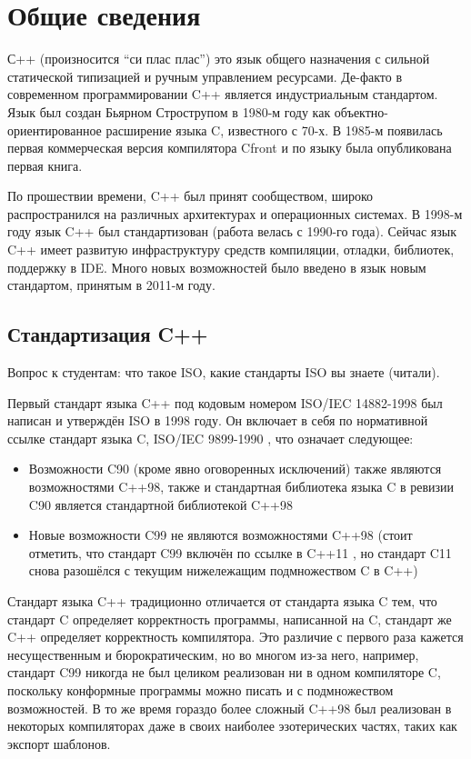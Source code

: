 \documentclass[a4paper,12pt,oneside]{article}
\begin{document}
\pagebreak
\section{Общие сведения}\label{Introduction}

С++ (произносится ``си плас плас'') это язык общего назначения с сильной статической типизацией и ручным управлением ресурсами. Де-факто в современном программировании C++ является индустриальным стандартом. Язык был создан Бьярном Строструпом в 1980-м году как объектно-ориентированное расширение языка C, известного с 70-х. В 1985-м появилась первая коммерческая версия компилятора Cfront и по языку была опубликована первая книга. 

По прошествии времени, C++ был принят сообществом, широко распространился на различных архитектурах и операционных системах. В 1998-м году язык C++ был стандартизован (работа велась с 1990-го года). Сейчас язык C++ имеет развитую инфраструктуру средств компиляции, отладки, библиотек, поддержку в IDE. Много новых возможностей было введено в язык новым стандартом, принятым в 2011-м году.

\subsection{Стандартизация C++}\label{Standartization}

Вопрос к студентам: что такое ISO, какие стандарты ISO вы знаете (читали).

Первый стандарт языка C++ под кодовым номером ISO/IEC 14882-1998 \cite{stdcpp98} был написан и утверждён ISO в 1998 году. Он включает в себя по нормативной ссылке стандарт языка C, ISO/IEC 9899-1990 \cite{stdc90}, что означает следующее: 
\begin{itemize}
\item
Возможности C90 (кроме явно оговоренных исключений) также являются возможностями C++98, также и стандартная библиотека языка C в ревизии C90 является стандартной библиотекой C++98
\item
Новые возможности C99 \cite{stdc90} не являются возможностями C++98 (стоит отметить, что стандарт C99 включён по ссылке в C++11 \cite{stdcpp11}, но стандарт C11 \cite{stdc11} снова разошёлся с текущим нижележащим подмножеством C в C++)
\end{itemize}

Стандарт языка C++ традиционно отличается от стандарта языка C тем, что стандарт C определяет корректность программы, написанной на C, стандарт же C++ определяет корректность компилятора. Это различие с первого раза кажется несущественным и бюрократическим, но во многом из-за него, например, стандарт C99 никогда не был целиком реализован ни в одном компиляторе C, поскольку конформные программы можно писать и с подмножеством возможностей. В то же время гораздо более сложный C++98 был реализован в некоторых компиляторах даже в своих наиболее эзотерических частях, таких как экспорт шаблонов.
\end{document}
